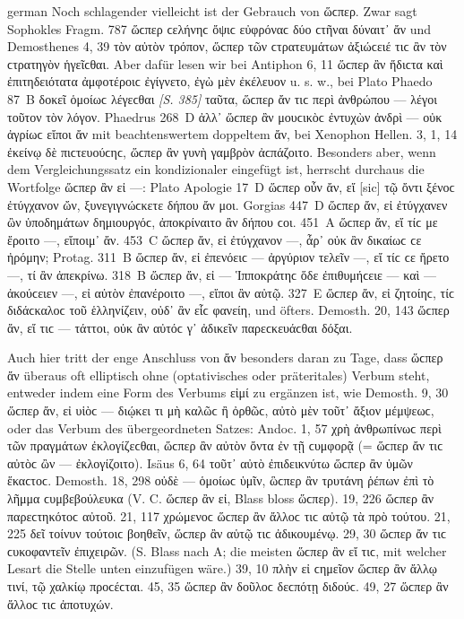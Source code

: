 \begin{otherlanguage*}{german}
Noch schlagender vielleicht ist der Gebrauch von ὥϲπερ. Zwar sagt Sophokles Fragm. 787 ὥϲπερ ϲελήνηϲ ὄψιϲ εὐφρόναϲ δύο ϲτῆναι δύναιτ᾽ ἄν und Demosthenes 4, 39 τὸν αὐτὸν τρόπον, ὥϲπερ τῶν ϲτρατευμάτων ἀξιώϲειέ τιϲ ἂν τὸν ϲτρατηγὸν ἡγεῖϲθαι. Aber dafür lesen wir bei Antiphon 6, 11 ὥϲπερ ἂν ἥδιϲτα καὶ ἐπιτηδειότατα ἀμφοτέροιϲ ἐγίγνετο, ἐγὼ μὲν ἐκέλευον u. s. w., bei Plato Phaedo 87~Β δοκεῖ ὁμοίωϲ λέγεϲθαι \hypertarget{p385}{\emph{[S. 385]}}\label{p385} ταῦτα, ὥϲπερ ἄν τιϲ περὶ ἀνθρώπου — λέγοι τοῦτον τὸν λόγον. Phaedrus 268~D ἀλλ᾽ ὥϲπερ ἂν μουϲικὸϲ ἐντυχὼν ἀνδρὶ — οὐκ ἀγρίωϲ εἴποι ἄν mit beachtenswertem doppeltem ἄν, bei Xenophon Hellen. 3, 1, 14 ἐκείνῳ δὲ πιϲτευούϲηϲ, ὥϲπερ ἂν γυνὴ γαμβρὸν ἀϲπάζοιτο. Besonders aber, wenn dem Vergleichungssatz ein kondizionaler eingefügt ist, herrscht durchaus die Wortfolge ὥϲπερ ἂν εἰ —: Plato Apologie 17~D ὥϲπερ οὖν ἄν, εἴ [sic] τῷ ὄντι ξένοϲ ἐτύγχανον ὤν, ξυνεγιγνώϲκετε δήπου ἄν μοι. Gorgias 447~D ὥϲπερ ἄν, εἰ ἐτύγχανεν ὢν ὑποδημάτων δημιουργόϲ, ἀποκρίναιτο ἂν δήπου ϲοι. 451~Α ὥϲπερ ἄν, εἴ τίϲ με ἔροιτο —, εἴποιμ᾽ ἄν. 453~C ὥϲπερ ἄν, εἰ ἐτύγχανον —, ἆρ᾽ οὐκ ἂν δικαίωϲ ϲε ἠρόμην; Protag. 311~Β ὥϲπερ ἄν, εἰ ἐπενόειϲ — ἀργύριον τελεῖν —, εἴ τίϲ ϲε ἤρετο —, τί ἂν ἀπεκρίνω. 318~Β ὥϲπερ ἄν, εἰ — Ἱπποκράτηϲ ὅδε ἐπιθυμήϲειε — καὶ — ἀκούϲειεν —, εἰ αὐτὸν ἐπανέροιτο —, εἴποι ἂν αὐτῷ. 327~Ε ὥϲπερ ἄν, εἰ ζητοίηϲ, τίϲ διδάϲκαλοϲ τοῦ ἑλληνίζειν, οὐδ᾽ ἂν εἷϲ φανείη, und öfters. Demosth. 20, 143 ὥϲπερ ἄν, εἴ τιϲ — τάττοι, οὐκ ἂν αὐτόϲ γ᾽ ἀδικεῖν παρεϲκευάϲθαι δόξαι.

Auch hier tritt der enge Anschluss von ἄν besonders daran zu Tage, dass ὥϲπερ ἄν überaus oft elliptisch ohne (optativisches oder präteritales) Verbum steht, entweder indem eine Form des Verbums εἰμί zu ergänzen ist, wie Demosth. 9, 30 ὥϲπερ ἄν, εἰ υἱὸϲ — διῴκει τι μὴ καλῶϲ ἢ ὀρθῶϲ, αὐτὸ μὲν τοῦτ᾽ ἄξιον μέμψεωϲ, oder das Verbum des übergeordneten Satzes: Andoc. 1, 57 χρὴ ἀνθρωπίνωϲ περὶ τῶν πραγμάτων ἐκλογίζεϲθαι, ὥϲπερ ἂν αὐτὸν ὄντα ἐν τῇ ϲυμφορᾷ (= ὥϲπερ ἄν τιϲ αὐτὸϲ ὢν — ἐκλογίζοιτο). Isäus 6, 64 τοῦτ᾽ αὐτὸ ἐπιδεικνύτω ὥϲπερ ἂν ὑμῶν ἕκαϲτοϲ. Demosth. 18, 298 οὐδὲ — ὁμοίωϲ ὑμῖν, ὣϲπερ ἂν τρυτάνη ῥέπων ἐπὶ τὸ λῆμμα ϲυμβεβούλευκα (V. C. ὥϲπερ ἂν εἰ, Blass bloss ὥϲπερ). 19, 226 ὥϲπερ ἂν παρεϲτηκότοϲ αὐτοῦ. 21, 117 χρώμενοϲ ὥϲπερ ἂν ἄλλοϲ τιϲ αὐτῷ τὰ πρὸ τούτου. 21, 225 δεῖ τοίνυν τούτοιϲ βοηθεῖν, ὥϲπερ ἂν αὑτῷ τιϲ ἀδικουμένῳ. 29, 30 ὥϲπερ ἄν τιϲ ϲυκοφαντεῖν ἐπιχειρῶν. (S. Blass nach A; die meisten ὥϲπερ ἂν εἴ τιϲ, mit welcher Lesart die Stelle unten einzufügen wäre.) 39, 10 πλὴν εἰ ϲημεῖον ὥϲπερ ἂν ἄλλῳ τινί, τῷ χαλκίῳ προϲέϲται. 45, 35 ὥϲπερ ἂν δοῦλοϲ δεϲπότῃ διδούϲ. 49, 27 ὥϲπερ ἂν ἄλλοϲ τιϲ ἀποτυχών.


\end{otherlanguage*}
